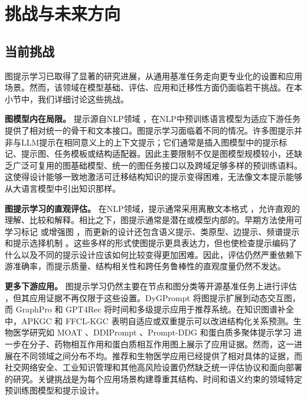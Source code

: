 \section{挑战与未来方向}\label{sec:dis}
\subsection{当前挑战}\label{sec:challenges}
图提示学习已取得了显著的研究进展，从通用基准任务走向更专业化的设置和应用场景。然而，该领域在模型基础、评估、应用和迁移性方面仍面临若干挑战。在本小节中，我们详细讨论这些挑战。

\textbf{图模型内在局限。} 提示源自NLP领域 \cite{brown2020language, lester2021power, liu2023pretrain}，在NLP中预训练语言模型为适应下游任务提供了相对统一的骨干和文本接口。图提示学习面临着不同的情况。许多图提示并非与LLM提示在相同意义上的上下文提示；它们通常是插入图模型中的提示标记、提示图、任务模板或结构适配器。因此主要限制不仅是图模型规模较小，还缺乏广泛可复用的图基础模型、统一的图任务接口以及跨域足够多样的预训练语料。这使得设计能够一致地激活可迁移结构知识的提示变得困难，无法像文本提示能够从大语言模型中引出知识那样。

\textbf{图提示学习的直观评估。}
在NLP领域，提示通常采用离散文本格式 \cite{brown2020language, robinson2023leveraging}，允许直观的理解、比较和解释。相比之下，图提示通常是潜在或模型内部的。早期方法使用可学习标记 \cite{sun2022gppt, fang2023universal, fang2022prompt, tan2023virtual, ma2023hetgpt} 或增强图 \cite{sun2023all, huang2023prodigy, ge2023enhancing}，而更新的设计还包含语义提示、类原型、边提示、频谱提示和提示选择机制 \cite{gong2024selfpro, ge2024psp, fu2025edge, yan2024igap, lv2025graphprompter}。这些多样的形式使图提示更具表达力，但也使检查提示编码了什么以及不同的提示设计应该如何比较变得更加困难。因此，评估仍然严重依赖下游准确率，而提示质量、结构相关性和跨任务鲁棒性的直观度量仍然不发达。

\textbf{更多下游应用。}
图提示学习仍然主要在节点和图分类等开源基准任务上进行评估 \cite{hamilton2017inductive, xu2018how}，但其应用证据不再仅限于这些设置。DyGPrompt \cite{yu2025dygprompt} 将图提示扩展到动态交互图，而 GraphPro \cite{yang2024graphpro} 和 GPT4Rec \cite{zhang2024gpt4rec} 将时间和多级提示应用于推荐系统。在知识图谱补全中，APKGC \cite{maoliniyazi2026apkgc} 和 FFCL-KGC \cite{zhu2026ffclkgc} 表明自适应或双重提示可以改进结构化关系预测。生物医学研究如 MOAT \cite{long2024moat}、DDIPrompt \cite{wang2024ddiprompt}、Prompt-DDG \cite{wu2024promptddg} 和蛋白质多聚体提示学习 \cite{gao2024protein} 进一步在分子、药物相互作用和蛋白质相互作用图上展示了应用证据。然而，这一进展在不同领域之间分布不均。推荐和生物医学应用已经提供了相对具体的证据，而社交网络安全、工业知识管理和其他高风险设置仍然缺乏统一评估协议和面向部署的研究。关键挑战是为每个应用场景构建尊重其结构、时间和语义约束的领域特定预训练图模型和提示设计。

